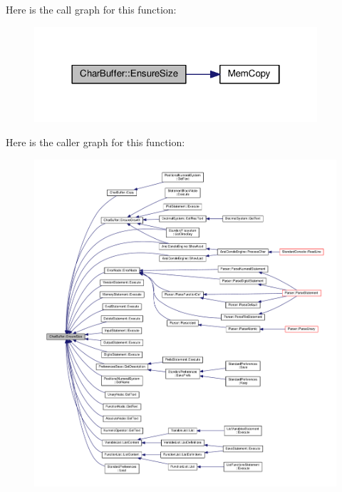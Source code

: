 Here is the call graph for this function\+:\nopagebreak
\begin{figure}[H]
\begin{center}
\leavevmode
\includegraphics[width=298pt]{classCharBuffer_ad1907009b5ad136692b989fa96bf2f7e_cgraph}
\end{center}
\end{figure}




Here is the caller graph for this function\+:\nopagebreak
\begin{figure}[H]
\begin{center}
\leavevmode
\includegraphics[width=350pt]{classCharBuffer_ad1907009b5ad136692b989fa96bf2f7e_icgraph}
\end{center}
\end{figure}


